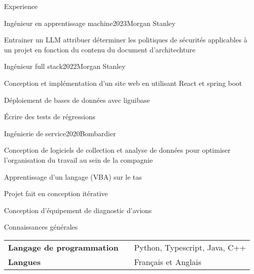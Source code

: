 \documentclass{resume} %
\begin{document}

\begin{rSection}{Experience}
	\begin{rSubsection}{Ingénieur en apprentissage machine}{2023}{Morgan Stanley}{}{}
		\item Entrainer un LLM attribuer déterminer les politiques de sécurités applicables à un projet en fonction du contenu du document d'architechture
	\end{rSubsection}
	\begin{rSubsection}{Ingénieur full stack}{2022}{Morgan Stanley}{}{}
		\item Conception et implémentation d'un site web en utilisant React et spring boot
		\item Déploiement de bases de données avec liguibase
		\item Écrire des tests de régressions
	\end{rSubsection}
	\begin{rSubsection}{Ingénierie de service}{2020}{Bombardier}{}{}
		\item  Conception de logiciels de collection et analyse de données pour optimiser l'organisation du travail au sein de la compagnie
		\item Apprentissage d'un langage (VBA) sur le tas
		\item Projet fait en conception itérative
		\item Conception d'équipement de diagnostic d'avions
	\end{rSubsection}

\end{rSection}



\begin{rSection}{Connaissances générales}

	\begin{tabular}{ @{} >{\bfseries}l @{\hspace{6ex}} l }
		Langage de programmation \  & Python, Typescript, Java, C++ \\
		Langues                & Français et Anglais
	\end{tabular}

\end{rSection}
\end{document}
